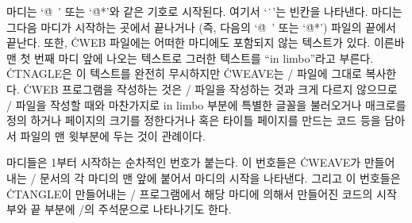 마디는 `\.{@\ }' 또는 `\.{@*}'와 같은 기호로 시작된다. 여기서 `\.{\ }'는 빈칸을
나타낸다. 마디는 그다음 마디가 시작하는 곳에서 끝나거나
(즉, 다음의 `\.{@\ }' 또는 `\.{@*}') 파일의 끝에서 끝난다. 또한, \.{CWEB} 
파일에는 어떠한 마디에도 포함되지 않는 텍스트가 있다. 이른바 맨 첫 번째
마디 앞에 나오는 텍스트로 그러한 텍스트를 ``in limbo''라고 부른다.
\.{CTNAGLE}은 이 텍스트를 완전히 무시하지만 \.{CWEAVE}는 \TEX/ 파일에
그대로 복사한다. %
\.{CWEB} 프로그램을 작성하는 것은 \TEX/ 파일을 작성하는 것과 크게 다르지
않으므로 \TEX/ 파일을 작성할 때와 마찬가지로
in limbo 부분에 특별한 글꼴을 불러오거나 매크로를 정의 
하거나 페이지의 크기를 정한다거나 혹은 타이틀 페이지를 만드는 코드 등을
담아서 파일의 맨 윗부분에 두는 것이 관례이다.

마디들은 1부터 시작하는 순차적인 번호가 붙는다. 이 번호들은 \.{CWEAVE}가
만들어 내는 \TEX/ 문서의 각 마디의 맨 앞에 붙어서 마디의 시작을 나타낸다.
그리고 이 번호들은 \.{CTANGLE}이 만들어내는 \CEE/ 프로그램에서 해당 마디에
의해서 만들어진 코드의 시작부와 끝 부분에 \CEE/의 주석문으로 나타나기도 한다.

